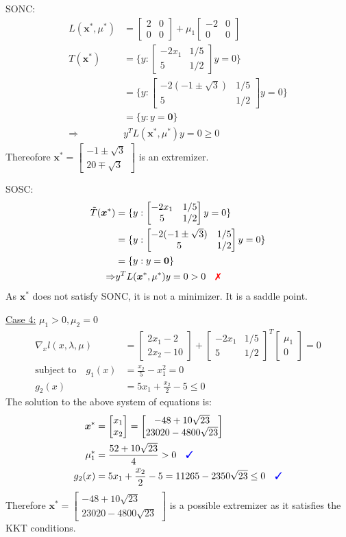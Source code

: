 \documentclass[a4paper,11pt]{article}
\newcommand{\V}[1]{\boldsymbol{#1}}
\newcommand{\mat}[1]{\begin{bmatrix}#1\end{bmatrix}}
\newcommand{\cmark}{{\color{blue}\text{\ding{51}}}}%
\newcommand{\xmark}{{\color{red}\text{\ding{55}}}}%
\begin{document}
\noindent SONC:
\begin{align*}
 L(\V{x}^*,\mu^*)& = \mat{2&0\\0&0} +\mu_1\mat{-2 & 0\\ 0& 0}\\
 T(\V{x}^*)&= \{y: \mat{-2x_1 & 1/5\\ 5&  1/2}y = 0 \}\\
 &= \{y: \mat{-2(-1\pm\sqrt{3})& 1/5\\ 5&  1/2}y = 0 \}\\
 &= \{y: y=\V{0}\}\\
 \Rightarrow& y^TL(\V{x}^*,\mu^*)y = 0 \geq 0
\end{align*}
Thereofore $\V{x}^*  = \mat{-1\pm\sqrt{3}\\ 20\mp\sqrt{3}}$ is an extremizer.

\noindent SOSC:
\begin{align*}
 \tilde{T}(\V{x}^*)&= \{y: \mat{-2x_1 & 1/5\\ 5&  1/2}y = 0 \}\\
 &= \{y: \mat{-2(-1\pm\sqrt{3})& 1/5\\ 5&  1/2}y = 0 \}\\
 &= \{y: y=\V{0}\}\\
 \Rightarrow& y^TL(\V{x}^*,\mu^*)y = 0 > 0 \quad \xmark
\end{align*}
As $\V{x}^*$ does not satisfy SONC, it is not a minimizer. It is a saddle point.


\noindent\underline{Case 4:} $\mu_1>0,\mu_2=0$ 
\begin{align*}
 \nabla_x l(x,\lambda,\mu) &= \mat{2x_1 -2\\ 2x_2-10} +\mat{-2x_1 & 1/5\\ 5& 1/2}^T\mat{\mu_1\\ 0} =0\\
 \text{subject to}\quad g_1(x)&=\frac{x_2}{5}-x_1^2 = 0\\
 g_2(x)&=5x_1 +\frac{x_2}{2}-5\leq 0
\end{align*}
The solution to the above system of equations is:
\begin{align*}
 \V{x}^* &= \mat{x_1\\x_2}=\mat{-48+10\sqrt{23}\\23020-4800\sqrt{23}}\\
 \mu_1^*&= \frac{52+10\sqrt{23}}{4} >0 \quad \cmark\\
 g_2(x)&= 5x_1 +\frac{x_2}{2}-5 = 11265 - 2350\sqrt{23} \leq 0 \quad\cmark
\end{align*}
Therefore $\V{x}^*= \mat{-48+10\sqrt{23}\\23020-4800\sqrt{23}}$ is a possible extremizer as it satisfies the KKT conditions.
\end{document}
